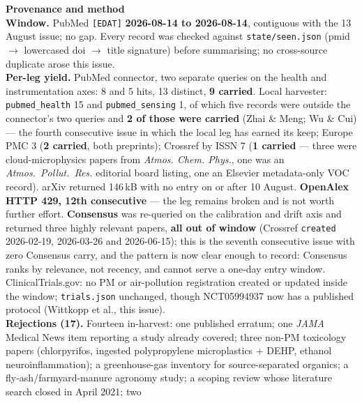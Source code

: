 \documentclass[10pt]{article}
\begin{document}


\vspace{4mm}
\begin{keybox}
{\sffamily\bfseries\footnotesize\color{Deep}Provenance and method}\\[1.2mm]
{\fontsize{7.2}{8.8}\selectfont
\textbf{Window.} PubMed \texttt{[EDAT]} \textbf{2026-08-14 to 2026-08-14}, contiguous with
the 13 August issue; no gap. Every record was checked against
\texttt{state/seen.json} (pmid $\rightarrow$ lowercased doi $\rightarrow$ title signature)
before summarising; no cross-source duplicate arose this issue.\\[0.8mm]
\textbf{Per-leg yield.} PubMed connector, two separate queries on the health and
instrumentation axes: 8 and 5 hits, 13 distinct, \textbf{9 carried}. Local harvester:
\texttt{pubmed\_health} 15 and \texttt{pubmed\_sensing} 1, of which five records were
outside the connector's two queries and \textbf{2 of those were carried} (Zhai \& Meng;
Wu \& Cui) --- the fourth consecutive issue in which the local leg has earned its
keep; Europe PMC 3 (\textbf{2 carried}, both preprints); Crossref by ISSN 7
(\textbf{1 carried} --- three were cloud-microphysics papers from \textit{Atmos. Chem.
Phys.}, one was an \textit{Atmos.\ Pollut.\ Res.} editorial board listing, one an
Elsevier metadata-only VOC record). arXiv returned 146\,kB with no entry on or after
10 August. \textbf{OpenAlex HTTP 429, 12th consecutive} --- the leg remains broken and is
not worth further effort. \textbf{Consensus} was re-queried on the calibration and drift
axis and returned three highly relevant papers, \textbf{all out of window} (Crossref
\texttt{created} 2026-02-19, 2026-03-26 and 2026-06-15); this is the seventh consecutive
issue with zero Consensus carry, and the pattern is now clear enough to record: Consensus
ranks by relevance, not recency, and cannot serve a one-day entry window.
ClinicalTrials.gov: no PM or air-pollution registration created or updated inside the
window; \texttt{trials.json} unchanged, though NCT05994937 now has a published protocol
(Wittkopp et al., this issue).\\[0.8mm]
\textbf{Rejections (17).} Fourteen in-harvest: one published erratum; one \textit{JAMA}
Medical News item reporting a study already covered; three non-PM toxicology papers
(chlorpyrifos, ingested polypropylene microplastics + DEHP, ethanol neuroinflammation); a
greenhouse-gas inventory for source-separated organics; a fly-ash/farmyard-manure
agronomy study; a scoping review whose literature search closed in April 2021; two
}
\end{keybox}
\end{document}
